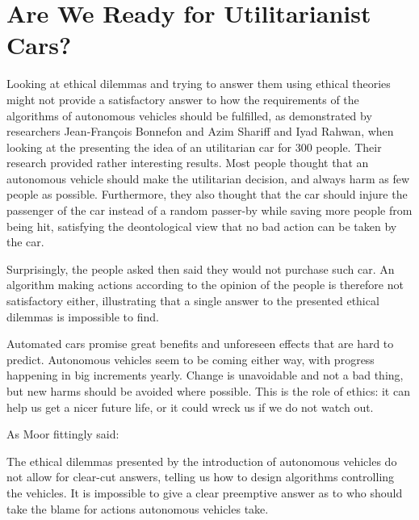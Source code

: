 \section{Are We Ready for Utilitarianist Cars?}
Looking at ethical dilemmas and trying to answer them using ethical theories might not provide a satisfactory answer to how the requirements of the algorithms of autonomous vehicles should be fulfilled, as demonstrated by researchers Jean{-}Fran{\c{c}}ois Bonnefon and Azim Shariff and Iyad Rahwan, when looking at the presenting the idea of an utilitarian car for 300 people. \cite{DBLP:journals/corr/BonnefonSR15}
Their research provided rather interesting results. Most people thought that an autonomous vehicle should make the utilitarian decision, and always harm as few people as possible. Furthermore, they also thought that the car should injure the passenger of the car instead of a random passer-by while saving more people from being hit, satisfying the deontological view that no bad action can be taken by the car. 

Surprisingly, the people asked then said they would not purchase such car. An algorithm making actions according to the opinion of the people is therefore not satisfactory either, illustrating that a single answer to the presented ethical dilemmas is impossible to find. 

Automated cars promise great benefits and unforeseen effects that are hard to predict. Autonomous vehicles seem to be coming either way, with progress happening in big increments yearly. Change is unavoidable and not a bad thing, but new harms should be avoided where possible. This is the role of ethics: it can help us get a nicer future life, or it could wreck us if we do not watch out.

As Moor fittingly said: 
\begin{quote}
\end{quote}

The ethical dilemmas presented by the introduction of autonomous vehicles do not allow for clear-cut answers, telling us how to design algorithms controlling the vehicles. It is impossible to give a clear preemptive answer as to who should take the blame for actions autonomous vehicles take.
